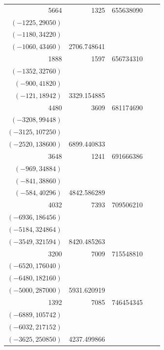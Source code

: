 \documentclass[11pt]{article}
\begin{document}
\begin{longtable}{r r r l r}
5664 & 1325 & 655638090 & \begin{tabular}[t]{@{}l@{}}$(-1272,21624)$\\$(-1225,29050)$\\$(-1180,34220)$\\$(-1060,43460)$\end{tabular} & 2706.748641\\[5pt]
1888 & 1597 & 656734310 & \begin{tabular}[t]{@{}l@{}}$(-1444,27132)$\\$(-1352,32760)$\\$(-900,41820)$\\$(-121,18942)$\end{tabular} & 3329.154885\\[5pt]
4480 & 3609 & 681174690 & \begin{tabular}[t]{@{}l@{}}$(-3584,26880)$\\$(-3208,99448)$\\$(-3125,107250)$\\$(-2520,138600)$\end{tabular} & 6899.440833\\[5pt]
3648 & 1241 & 691666386 & \begin{tabular}[t]{@{}l@{}}$(-1216,12160)$\\$(-969,34884)$\\$(-841,38860)$\\$(-584,40296)$\end{tabular} & 4842.586289\\[5pt]
4032 & 7393 & 709506210 & \begin{tabular}[t]{@{}l@{}}$(-7168,134400)$\\$(-6936,186456)$\\$(-5184,324864)$\\$(-3549,321594)$\end{tabular} & 8420.485263\\[5pt]
3200 & 7009 & 715548810 & \begin{tabular}[t]{@{}l@{}}$(-6845,106190)$\\$(-6520,176040)$\\$(-6480,182160)$\\$(-5000,287000)$\end{tabular} & 5931.620919\\[5pt]
1392 & 7085 & 746454345 & \begin{tabular}[t]{@{}l@{}}$(-6912,99648)$\\$(-6889,105742)$\\$(-6032,217152)$\\$(-3625,250850)$\end{tabular} & 4237.499866\\[5pt]

\end{longtable}
\end{document}

